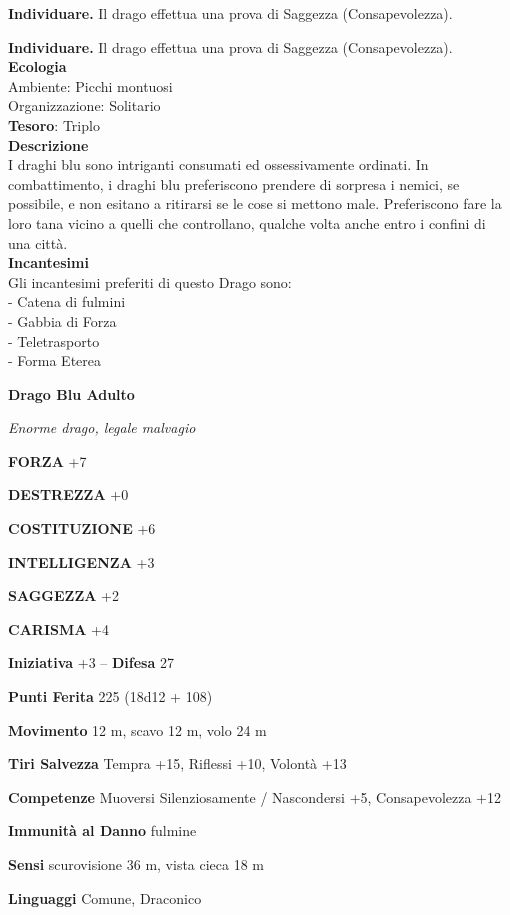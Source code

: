\begin{multicols}{2}
\textbf{Individuare.} Il drago effettua una prova di Saggezza (Consapevolezza).

\textbf{Individuare.} Il drago effettua una prova di Saggezza (Consapevolezza).\\
\textbf{Ecologia}\\
Ambiente: Picchi montuosi\\
Organizzazione: Solitario\\
\textbf{Tesoro}: Triplo\\
\textbf{Descrizione}\\
I draghi blu sono intriganti consumati ed ossessivamente ordinati. In combattimento, i draghi blu preferiscono prendere di sorpresa i nemici, se possibile, e non esitano a ritirarsi se le cose si mettono male. Preferiscono fare la loro tana vicino a quelli che controllano, qualche volta anche entro i confini di una città.\\
\textbf{Incantesimi}\\
Gli incantesimi preferiti di questo Drago sono:\\
- Catena di fulmini\\
- Gabbia di Forza\\
- Teletrasporto\\
- Forma Eterea


\medskip{}\textbf{Drago Blu Adulto}

\textit{Enorme drago, legale malvagio}

\textbf{FORZA} +7

\textbf{DESTREZZA} +0

\textbf{COSTITUZIONE} +6

\textbf{INTELLIGENZA} +3

\textbf{SAGGEZZA} +2

\textbf{CARISMA} +4

\textbf{Iniziativa} +3 -- \textbf{Difesa} 27

\textbf{Punti Ferita} 225 (18d12 + 108)

\textbf{Movimento} 12 m, scavo 12 m, volo 24 m

\textbf{Tiri Salvezza} Tempra +15, Riflessi +10, Volontà +13

\textbf{Competenze} Muoversi Silenziosamente / Nascondersi +5, Consapevolezza +12

\textbf{Immunità al Danno} fulmine

\textbf{Sensi} scurovisione 36 m, vista cieca 18 m

\textbf{Linguaggi} Comune, Draconico


\end{multicols}
